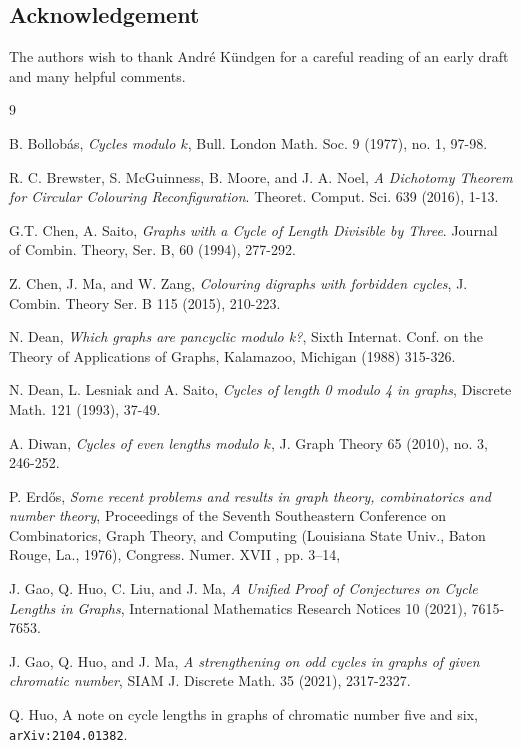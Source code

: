 \documentclass[12pt]{article}
\numberwithin{theorem}{section}
\begin{document}
\subsection*{Acknowledgement}

The authors wish to thank Andr\'e K\"undgen for a careful reading of an early draft and many helpful comments.


\begin{thebibliography}{9}


 B. Bollob\'as, {\em Cycles modulo $k$}, Bull. London Math. Soc. 9 (1977), no. 1, 97-98.



R. C. Brewster, S. McGuinness, B. Moore, and J. A. Noel, \emph{A Dichotomy Theorem for Circular Colouring Reconfiguration}. {Theoret. Comput. Sci.} 639 (2016), 1-13.

G.T. Chen, A. Saito, \emph{Graphs with a Cycle of Length Divisible by Three}. {Journal of Combin. Theory, Ser. B}, 60 (1994), 277-292.

 Z. Chen, J. Ma, and W. Zang, {\em Colouring digraphs with forbidden cycles}, J. Combin. Theory
Ser. B 115 (2015), 210-223.


N. Dean, \emph{Which graphs are pancyclic modulo k?}, Sixth Internat. Conf. on the Theory of Applications of Graphs, Kalamazoo, Michigan (1988) 315-326.


 N. Dean, L. Lesniak and A. Saito, \emph{Cycles of length 0 modulo 4 in graphs}, {Discrete Math.} 121 (1993), 37-49.

 A. Diwan, {\em Cycles of even lengths modulo $k$}, J. Graph Theory 65 (2010), no. 3, 246-252.


 P. Erd\H{o}s, {\em Some recent problems and results in graph theory, combinatorics and number theory}, Proceedings of the Seventh Southeastern Conference on Combinatorics, Graph Theory, and Computing (Louisiana State Univ., Baton Rouge, La., 1976), Congress. Numer. XVII , pp. 3--14,

J. Gao, Q. Huo, C. Liu, and J. Ma, \emph{A Unified Proof of Conjectures on Cycle Lengths in Graphs}, {International Mathematics Research Notices} 10 (2021), 7615-7653.

 J. Gao, Q. Huo, and J. Ma, {\em A strengthening on odd cycles in graphs of given chromatic
number}, SIAM J. Discrete Math. 35 (2021), 2317-2327.

 Q. Huo, A note on cycle lengths in graphs of chromatic number five and six, {\tt arXiv:2104.01382}.


\end{thebibliography}
\end{document}
